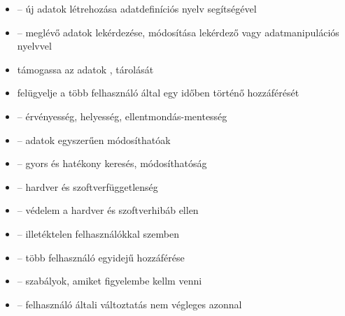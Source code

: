\documentclass[main.tex]{subfiles}
\begin{document}
  \begin{itemize}
    \item {} – új adatok létrehozása adatdefiníciós
    nyelv segítségével
    
    \item {} – meglévő adatok lekérdezése, módosítása
    lekérdező vagy adatmanipulációs nyelvvel

    \item támogassa az adatok ,
     tárolását

    \item felügyelje a több felhasználó által egy
    időben történő hozzáférését


    \item {} \tabto{4.5cm} – \tabto{5.5cm}
    érvényesség, helyesség, ellentmondás-mentesség
    
    \item {} \tabto{4.5cm} – \tabto{5.5cm}
    adatok egyszerűen módosíthatóak
    
    \item {} \tabto{4.5cm} – \tabto{5.5cm}
    gyors és hatékony keresés, módosíthatóság
    
    \item {} \tabto{4.5cm} – \tabto{5.5cm}
    hardver és szoftverfüggetlenség
    
    \item {} \tabto{4.5cm} – \tabto{5.5cm}
    védelem a hardver és szoftverhibáb ellen
    
    \item {} \tabto{4.5cm} – \tabto{5.5cm}
    illetéktelen felhasználókkal szemben
    
    \item {} \tabto{4.5cm} – \tabto{5.5cm}
    több felhasználó egyidejű hozzáférése

    \item {} \tabto{5cm} – \tabto{5.5cm}
    szabályok, amiket figyelembe kellm venni

    \item {} \tabto{4.5cm} – \tabto{5.5cm}
    felhasználó általi változtatás nem végleges azonnal
  \end{itemize}
\end{document}
